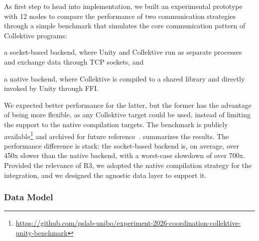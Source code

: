\documentclass[runningheads]{llncs}
\newenvironment{inlinelist}{\begin{enumerate*}[label=\emph{(\roman*)}]}{\end{enumerate*}}
\begin{document}
As first step to head into implementation,
we built an experimental prototype with 12 nodes to compare the performance of two communication strategies
through a simple benchmark that simulates the core communication pattern of Collektive programs:
\begin{inlinelist}
    \item a socket-based backend, where Unity and Collektive run as separate processes and exchange data through TCP sockets, and
    \item a native backend, where Collektive is compiled to a shared library and directly invoked by Unity through \ac{FFI}.
\end{inlinelist}
%
We expected better performance for the latter,
but the former has the advantage of being more flexible,
as any Collektive target could be used,
instead of limiting the support to the native compilation targets.
%
The benchmark is publicly available\footnote{
    \scriptsize
    \url{https://github.com/pslab-unibo/experiment-2026-coordination-collektive-unity-benchmark}
} and archived for future reference~\cite{benchmark-zenodo}.
%
 summarizes the results.
%
The performance difference is stark: the socket-based backend is, on average,
over 450x slower than the native backend,
with a worst-case slowdown of over 700x.
%
Provided the relevance of R3, we adopted the native compilation strategy for the integration,
and we designed the agnostic data layer to support it.

\subsubsection{Data Model}\label{sec:data-model-and-serialization}
\end{document}
